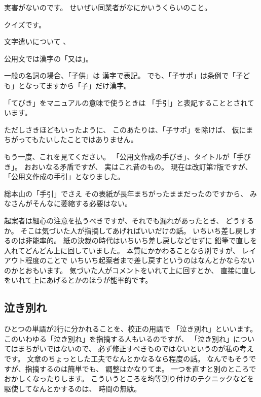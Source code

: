 \documentclass[uplatex,jis2004,dvipdfmx,12pt]{jsarticle}
\begin{document}
実害がないのです。
せいぜい同業者がなにかいうくらいのこと。

クイズです。

文字遣いについて
、

公用文では漢字の「又は」。

一般の名詞の場合、「子供」は
漢字で表記。
でも、「子サポ」は条例で「子ども」となってますから「子」だけ漢字。



「てびき」をマニュアルの意味で使うときは
「手引」と表記することとされています。

ただしさきほどもいったように、
このあたりは、「子サポ」を除けば、
仮にまちがってもたいしたことではありません。

もう一度、これを見てください。
「公用文作成の手びき」、タイトルが「手びき」。
おおいなる矛盾ですが、
実はこれ昔のもの。
現在は改訂第7版ですが、
「公用文作成の手引」となりました。

総本山の「手引」でさえ
その表紙が長年まちがったままだったのですから、
みなさんがそんなに萎縮する必要はない。


起案者は細心の注意を払うべきですが、それでも漏れがあったとき、
どうするか。
そこは気づいた人が指摘してあげればいいだけの話。
いちいち差し戻しするのは非能率的。
紙の決裁の時代はいちいち差し戻しなどせずに
鉛筆で直しを入れてどんどん上に回していました。
本質にかかわることなら別ですが、
レイアウト程度のことで
いちいち起案者まで差し戻すというのはなんとかならないのかとおもいます。
気づいた人がコメントをいれて上に回すとか、
直接に直しをいれて上にあげるとかのほうが能率的です。




\subsection{泣き別れ}
ひとつの単語が2行に分かれることを、校正の用語で
「泣き別れ」といいます。
このいわゆる「泣き別れ」を指摘する人もいるのですが、
「泣き別れ」についてはまちがいではないので、
必ず修正すべきものではないというのが私の考えです。
文章のちょっとした工夫でなんとかなるなら程度の話。
なんでもそうですが、指摘するのは簡単でも、
調整はかなりてま。
一つを直すと別のところでおかしくなったりします。
こういうところを均等割り付けのテクニックなどを駆使してなんとかするのは、
時間の無駄。
\end{document}
